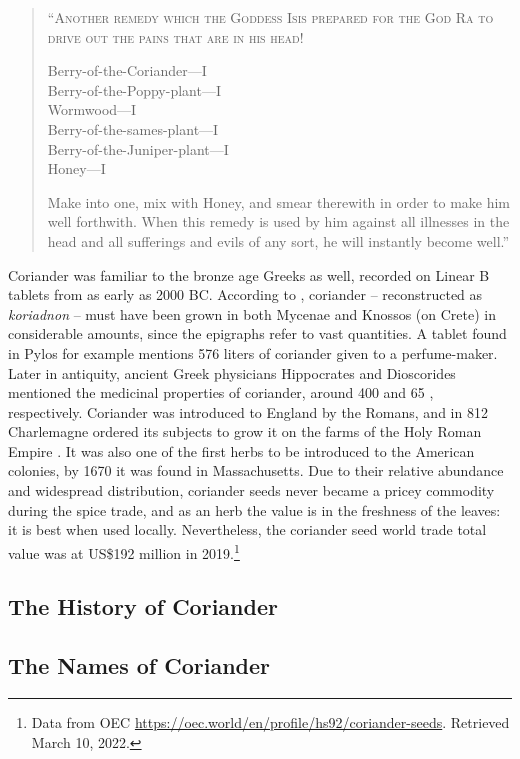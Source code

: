 \begin{quote}
\textsc{``Another remedy which the Goddess Isis prepared for the God Ra to drive out the pains that are in his head!}

\smallskip
Berry-of-the-Coriander---I\\
Berry-of-the-Poppy-plant---I\\
Wormwood---I\\
Berry-of-the-sames-plant---I\\
Berry-of-the-Juniper-plant---I\\
Honey---I
\smallskip

Make into one, mix with Honey, and smear therewith in order to make him well forthwith. When this remedy is used by him against all illnesses in the head and all sufferings and evils of any sort, he will instantly become well.'' \textcite[40]{bryan_papyrus_1930}
\end{quote}

Coriander was familiar to the bronze age Greeks as well, recorded on Linear B tablets from as early as 2000 BC. According to \textcite{chadwick_mycenaean_1976}, coriander -- reconstructed as \textit{koriadnon} -- must have been grown in both Mycenae and Knossos (on Crete) in considerable amounts, since the epigraphs refer to vast quantities. A tablet found in Pylos for example mentions 576 liters of coriander given to a perfume-maker. Later in antiquity, ancient Greek physicians Hippocrates and Dioscorides mentioned the medicinal properties of coriander, around 400 \BC and 65 \AD, respectively. Coriander was introduced to England by the Romans, and in 812 Charlemagne ordered its subjects to grow it on the farms of the Holy Roman Empire \parencite{prance_cultural_2005}. It was also one of the first herbs to be introduced to the American colonies, by 1670 it was found in Massachusetts. Due to their relative abundance and widespread distribution, coriander seeds never became a pricey commodity during the spice trade, and as an herb the value is in the freshness of the leaves: it is best when used locally. Nevertheless, the coriander seed world trade total value was at US\$192 million in 2019.\footnote{Data from OEC \url{https://oec.world/en/profile/hs92/coriander-seeds}. Retrieved March 10, 2022.}

\subsection{The History of Coriander}

\subsection{The Names of Coriander}

